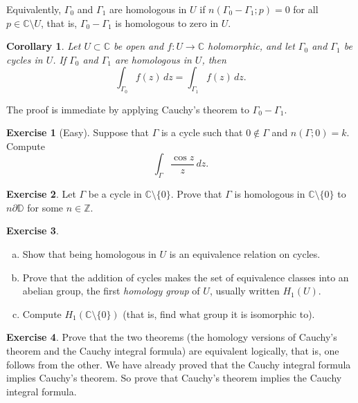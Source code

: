 \documentclass[12pt,openany]{book}
\newcommand{\C}{{\mathbb{C}}}
\newcommand{\Z}{{\mathbb{Z}}}
\newcommand{\D}{{\mathbb{D}}}
\newcommand{\myindex}[1]{#1\index{#1}}
\theoremstyle{plain}
\newtheorem{cor}[thm]{Corollary}
\theoremstyle{remark}
\theoremstyle{definition}
\newenvironment{exbox}{%
    \def\FrameCommand{\vrule width 1pt \relax\hspace{10pt}}%
    \MakeFramed{\advance\hsize-\width\FrameRestore}%
}{%
    \endMakeFramed
}
\newenvironment{exparts}{%
    \leavevmode\begin{enumerate}[a),noitemsep,topsep=0pt,parsep=0pt,partopsep=0pt]
}{%
    \end{enumerate}
}
\theoremstyle{exercise}
\newtheorem{exercise}{Exercise}[section]
\theoremstyle{example}
\begin{document}
Equivalently, $\Gamma_0$ and $\Gamma_1$ are homologous in $U$ if
$n(\Gamma_0 - \Gamma_1;p) = 0$ for all $p \in \C \setminus U$,
that is, $\Gamma_0-\Gamma_1$ is homologous to zero in $U$.

\begin{cor} \label{cor:homologoussameint}
Let $U \subset \C$ be open and $f \colon U \to \C$ holomorphic,
and let
$\Gamma_0$ and $\Gamma_1$ be cycles in $U$.
If 
$\Gamma_0$ and $\Gamma_1$ are
homologous in $U$, then
\begin{equation*}
\int_{\Gamma_0} f(z)\, dz = 
\int_{\Gamma_1} f(z)\, dz .
\end{equation*}
\end{cor}

The proof is immediate by applying Cauchy's theorem to $\Gamma_0-\Gamma_1$.

\begin{exbox}
\begin{exercise}[Easy]
Suppose that $\Gamma$ is a cycle such that
$0 \notin \Gamma$ and
$n(\Gamma;0) = k$.  Compute
\begin{equation*}
\int_{\Gamma} \frac{\cos z}{z} \, dz .
\end{equation*}
\end{exercise}

\begin{exercise}
Let $\Gamma$ be
a cycle in $\C \setminus \{ 0 \}$.
Prove that $\Gamma$ is homologous in $\C \setminus \{ 0 \}$
to $n \partial \D$ for some $n \in \Z$.
\end{exercise}

\begin{exercise} \label{exercise:H1U}
\begin{exparts}
\item
Show that being homologous in $U$ is an equivalence relation on cycles.
\item
Prove that the addition of cycles makes the set of equivalence classes
into an abelian group, the
first \emph{\myindex{homology group}} of $U$,
usually written $H_1(U)$.
\item
Compute $H_1(\C \setminus \{ 0 \})$ (that is,
find what group it is isomorphic to).
\end{exparts}
\end{exercise}

\begin{exercise}
Prove that the two theorems
(the homology versions of Cauchy's theorem and the Cauchy integral formula)
are equivalent logically, that is, one follows
from the other.  We have already proved that the Cauchy integral formula
implies Cauchy's theorem.  So prove that
Cauchy's theorem implies the Cauchy integral formula.
\end{exercise}


\end{exbox}
\end{document}
